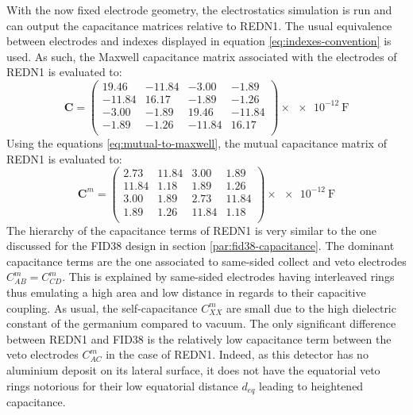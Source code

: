 With the now fixed electrode geometry, the electrostatics simulation is run and can output the capacitance matrices relative to REDN1. The usual equivalence between electrodes and indexes displayed in equation \ref{eq:indexes-convention} is used. As such, the Maxwell capacitance matrix associated with the electrodes of REDN1 is evaluated to:
\begin{equation}
\label{eq:redn1-maxwell}
\bm{C} = 
\begin{pmatrix}
  19.46 & -11.84 & -3.00 & -1.89\\
  -11.84 & 16.17 & -1.89 & -1.26\\
  -3.00 & -1.89 & 19.46 & -11.84\\
  -1.89 & -1.26 & -11.84 & 16.17\\
\end{pmatrix}
\times \SI{e-12}{\farad}
\end{equation}
Using the equations \ref{eq:mutual-to-maxwell}, the mutual capacitance matrix of REDN1 is evaluated to:
\begin{equation}
\label{eq:redn1-mutual}
\bm{C}^m = 
\begin{pmatrix}
  2.73 & 11.84 & 3.00 & 1.89\\
  11.84 & 1.18 & 1.89 & 1.26\\
  3.00 & 1.89 & 2.73 & 11.84\\
  1.89 & 1.26 & 11.84 & 1.18\\
\end{pmatrix}
\times \SI{e-12}{\farad}
\end{equation}
The hierarchy of the capacitance terms of REDN1 is very similar to the one discussed for the FID38 design in section \ref{par:fid38-capacitance}. The dominant capacitance terms are the one associated to same-sided collect and veto electrodes $C_{AB}^m=C_{CD}^m$. This is explained by same-sided electrodes having interleaved rings thus emulating a high area and low distance in regards to their capacitive coupling.
As usual, the self-capacitance $C_{XX}^m$ are small due to the high dielectric constant of the germanium compared to vacuum.
The only significant difference between REDN1 and FID38 is the relatively low capacitance term between the veto electrodes $C_{AC}^m$ in the case of REDN1. Indeed, as this detector has no aluminium deposit on its lateral surface, it does not have the equatorial veto rings notorious for their low equatorial distance $d_{eq}$ leading to heightened capacitance. 

